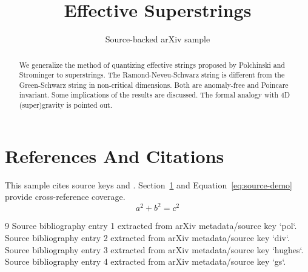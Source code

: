 \documentclass[11pt]{article}
\title{Effective Superstrings}
\author{Source-backed arXiv sample}
\date{}
\begin{document}
\maketitle
\begin{abstract}
We generalize the method of quantizing effective strings proposed by Polchinski and Strominger to superstrings. The Ramond-Neveu-Schwarz string is different from the Green-Schwarz string in non-critical dimensions. Both are anomaly-free and Poincare invariant. Some implications of the results are discussed. The formal analogy with 4D (super)gravity is pointed out.
\end{abstract}
\section{References And Citations}
\label{sec:refs}
This sample cites source keys \cite{pol} and \cite{div}. Section~\ref{sec:refs} and Equation~\ref{eq:source-demo} provide cross-reference coverage.
\begin{equation}
\label{eq:source-demo}
a^2 + b^2 = c^2
\end{equation}
\begin{thebibliography}{9}
 Source bibliography entry 1 extracted from arXiv metadata/source key `pol`.
 Source bibliography entry 2 extracted from arXiv metadata/source key `div`.
 Source bibliography entry 3 extracted from arXiv metadata/source key `hughes`.
 Source bibliography entry 4 extracted from arXiv metadata/source key `gs`.
\end{thebibliography}
\end{document}
